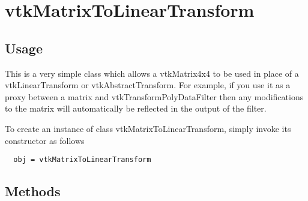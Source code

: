 \section{vtkMatrixToLinearTransform}

\subsection{Usage}

 This is a very simple class which allows a vtkMatrix4x4 to be used in
 place of a vtkLinearTransform or vtkAbstractTransform.  For example,
 if you use it as a proxy between a matrix and vtkTransformPolyDataFilter
 then any modifications to the matrix will automatically be reflected in
 the output of the filter.

To create an instance of class vtkMatrixToLinearTransform, simply
invoke its constructor as follows
\begin{verbatim}
  obj = vtkMatrixToLinearTransform
\end{verbatim}
\subsection{Methods}

